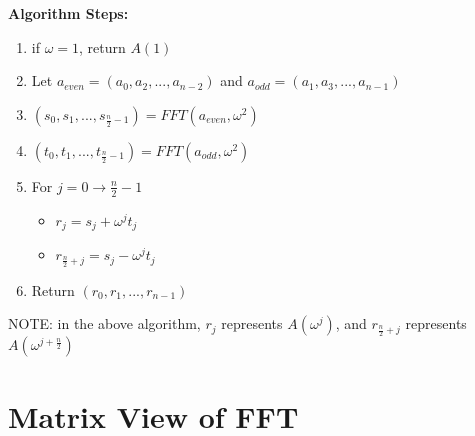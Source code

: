\documentclass[11pt]{article}
\begin{document}
\noindent
\textbf{Algorithm Steps:}
\begin{enumerate}
    \item if $\omega=1$, return $A(1)$
    \item Let $a_{even}=(a_0,a_2,...,a_{n-2})$ and $a_{odd}=(a_1,a_3,...,a_{n-1})$
    \item $(s_0,s_1,...,s_{\frac{n}{2}-1})=FFT(a_{even},\omega^2)$
    \item $(t_0,t_1,...,t_{\frac{n}{2}-1})=FFT(a_{odd},\omega^2)$
    \item For $j = 0 \xrightarrow{} \frac{n}{2} - 1$
    \begin{itemize}
        \item $r_j=s_j+\omega^jt_j$
        \item $r_{\frac{n}{2}+j}=s_j-\omega^jt_j$
    \end{itemize}
    \item Return $(r_0,r_1,...,r_{n-1})$
\end{enumerate}
\textsf{NOTE: in the above algorithm, $r_j$ represents $A(\omega^j)$, and $r_{\frac{n}{2}+j}$ represents $A(\omega^{j+\frac{n}{2}})$}

\section{Matrix View of FFT}



%
\end{document}
